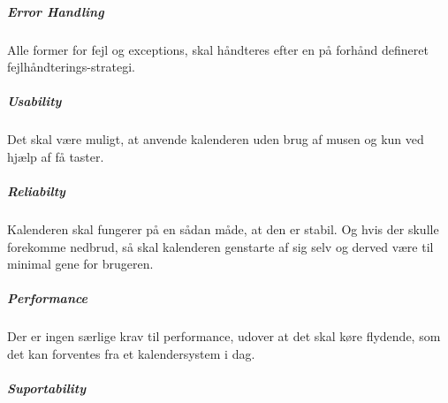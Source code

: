 \documentclass{article}
\begin{document}
   \subparagraph{Error Handling} \mbox{}
   
   Alle former for fejl og exceptions, skal håndteres efter en på forhånd defineret fejlhåndterings-strategi.
   \subparagraph{Usability} \mbox{}
   
   Det skal være muligt, at anvende kalenderen uden brug af musen og kun ved hjælp af få taster.
   \subparagraph{Reliabilty} \mbox{}
   
   Kalenderen skal fungerer på en sådan måde, at den er stabil. Og hvis der skulle forekomme nedbrud, så skal kalenderen genstarte af sig selv og derved være til minimal gene for brugeren.
   \subparagraph{Performance} \mbox{}
   
   Der er ingen særlige krav til performance, udover at det skal køre flydende, som det kan forventes fra et kalendersystem i dag.
   \subparagraph{Suportability} \mbox{}
   
   
   
   
  
\end{document}

